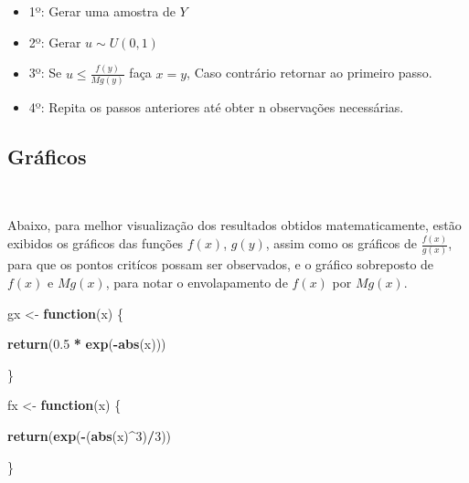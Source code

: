 \documentclass[11pt,]{article}
\newenvironment{Shaded}{\begin{snugshade}}{\end{snugshade}}
\newcommand{\ControlFlowTok}[1]{\textcolor[rgb]{0.13,0.29,0.53}{\textbf{#1}}}
\newcommand{\DecValTok}[1]{\textcolor[rgb]{0.00,0.00,0.81}{#1}}
\newcommand{\FloatTok}[1]{\textcolor[rgb]{0.00,0.00,0.81}{#1}}
\newcommand{\KeywordTok}[1]{\textcolor[rgb]{0.13,0.29,0.53}{\textbf{#1}}}
\newcommand{\NormalTok}[1]{#1}
\newcommand{\OperatorTok}[1]{\textcolor[rgb]{0.81,0.36,0.00}{\textbf{#1}}}
\newcommand{\StringTok}[1]{\textcolor[rgb]{0.31,0.60,0.02}{#1}}
\providecommand{\tightlist}{%
  \setlength{\itemsep}{0pt}\setlength{\parskip}{0pt}}
\begin{document}
\begin{itemize}
\tightlist
\item
  1º: Gerar uma amostra de \(Y\)
\item
  2º: Gerar \(u \sim U(0,1)\)
\item
  3º: Se \(u \leq \frac{f(y)}{Mg(y)}\) faça \(x = y\), Caso contrário
  retornar ao primeiro passo.
\item
  4º: Repita os passos anteriores até obter n observações necessárias.
\end{itemize}

\hypertarget{gruxe1ficos}{%
\subsection{Gráficos}\label{gruxe1ficos}}

~

Abaixo, para melhor visualização dos resultados obtidos matematicamente,
estão exibidos os gráficos das funções \(f(x)\), \(g(y)\), assim como os
gráficos de \(\frac{f(x)}{g(x)}\), para que os pontos critícos possam
ser observados, e o gráfico sobreposto de \(f(x)\) e \(Mg(x)\), para
notar o envolapamento de \(f(x)\) por \(Mg(x)\).

\begin{Shaded}
\begin{Highlighting}[]
\NormalTok{gx <-}\StringTok{ }\ControlFlowTok{function}\NormalTok{(x) \{}

  \KeywordTok{return}\NormalTok{(}\FloatTok{0.5} \OperatorTok{*}\StringTok{ }\KeywordTok{exp}\NormalTok{(}\OperatorTok{-}\KeywordTok{abs}\NormalTok{(x)))}

\NormalTok{\}}

\NormalTok{fx <-}\StringTok{ }\ControlFlowTok{function}\NormalTok{(x) \{}

  \KeywordTok{return}\NormalTok{(}\KeywordTok{exp}\NormalTok{(}\OperatorTok{-}\NormalTok{(}\KeywordTok{abs}\NormalTok{(x)}\OperatorTok{^}\DecValTok{3}\NormalTok{)}\OperatorTok{/}\DecValTok{3}\NormalTok{))}

\NormalTok{\}}
\end{Highlighting}
\end{Shaded}
\end{document}
